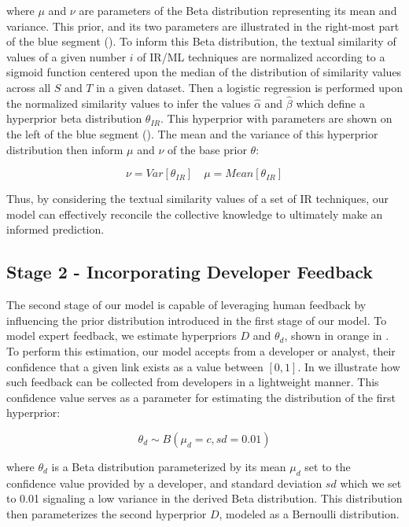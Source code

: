 \noindent where $\mu$ and $\nu$ are parameters of the Beta distribution representing its mean and variance. This prior, and its two parameters are illustrated in the right-most part of the blue segment (). To inform this Beta distribution, the textual similarity of values of a given number $i$ of IR/ML techniques are normalized according to a sigmoid function centered upon the median of the distribution of similarity values across all $S$ and $T$ in a given dataset. Then a logistic regression is performed upon the normalized similarity values to infer the values $\hat{\alpha}$ and $\hat{\beta}$ which define a hyperprior beta distribution $\theta_{IR}$. This hyperprior with parameters are shown on the left of the blue segment (). The mean and the variance of this hyperprior distribution then inform $\mu$ and $\nu$ of the base prior $\theta$:


\begin{equation}\label{eq:lvl1-params}
\nu = Var[\theta_{IR}] \quad \mu = Mean[\theta_{IR}]
\end{equation}

Thus, by considering the textual similarity values of a set of IR techniques, our model can effectively reconcile the collective knowledge to ultimately make an informed prediction.

\subsection{Stage 2 - Incorporating Developer Feedback}
\label{sub:model-comp2}

The second stage of our model is capable of leveraging human feedback by influencing the prior distribution introduced in the first stage of our model. To model expert feedback, we estimate hyperpriors $D$ and $\theta_d$, shown in orange in . To perform this estimation, our model accepts from a developer or analyst, their confidence that a given link exists as a value between $[0,1]$. In   we illustrate how such feedback can be collected from developers in a lightweight manner. This confidence value serves as a parameter for estimating the distribution of the first hyperprior:

\begin{equation}
\theta_{d} \sim B(\mu_{d}=c,sd=0.01)	
\end{equation}

\noindent where $\theta_{d}$ is a Beta distribution parameterized by its mean $\mu_d$ set to the confidence value provided by a developer, and standard deviation $sd$ which we set to 0.01 signaling a low variance in the derived Beta distribution. This distribution then parameterizes the second hyperprior $D$, modeled as a Bernoulli distribution.

